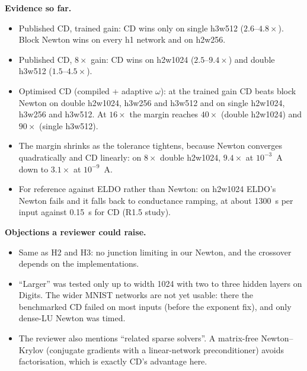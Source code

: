 \documentclass[11pt,a4paper]{article}
\newcommand{\evidence}{\par\noindent\textbf{Evidence so far.}\par}
\newcommand{\objections}{\par\noindent\textbf{Objections a reviewer could raise.}\par}
\begin{document}

\evidence
\begin{itemize}
\item Published CD, trained gain: CD wins only on single h3w512
($2.6$--$4.8\times$). Block Newton wins on every h1 network and on
h2w256.
\item Published CD, $8\times$ gain: CD wins on h2w1024 ($2.5$--$9.4\times$)
and double h3w512 ($1.5$--$4.5\times$).
\item Optimised CD (compiled + adaptive $\omega$): at the trained gain CD
beats block Newton on double h2w1024, h3w256 and h3w512 and on single
h2w1024, h3w256 and h3w512. At $16\times$ the margin reaches $40\times$
(double h2w1024) and $90\times$ (single h3w512).
\item The margin shrinks as the tolerance tightens, because Newton
converges quadratically and CD linearly: on $8\times$ double h2w1024,
$9.4\times$ at $10^{-3}$~A down to $3.1\times$ at $10^{-9}$~A.
\item For reference against ELDO rather than Newton: on h2w1024 ELDO's
Newton fails and it falls back to conductance ramping, at about 1300~s per
input against 0.15~s for CD (R1.5 study).
\end{itemize}

\objections
\begin{itemize}
\item Same as H2 and H3: no junction limiting in our Newton, and the
crossover depends on the implementations.
\item ``Larger'' was tested only up to width 1024 with two to three hidden
layers on Digits. The wider MNIST networks are not yet usable: there the
benchmarked CD failed on most inputs (before the exponent fix), and only
dense-LU Newton was timed.
\item The reviewer also mentions ``related sparse solvers''. A
matrix-free Newton--Krylov (conjugate gradients with a linear-network
preconditioner) avoids factorisation, which is exactly CD's advantage here.
\end{itemize}
\end{document}
